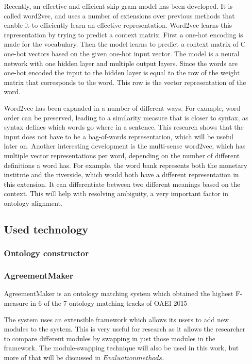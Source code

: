 \documentclass{article}
\begin{document}
 Recently, an effective and efficient skip-gram model has been developed. It is called word2vec, and uses a number of extensions over previous methods that enable it to efficiently learn an effective representation.
  Word2vec learns this representation by trying to predict a context matrix. First a one-hot encoding is made for the vocabulary. Then the model learns to predict a context matrix of C one-hot vectors based on the given one-hot input vector. The model is a neural network with one hidden layer and multiple output layers. Since the words are one-hot encoded the input to the hidden layer is equal to the row of the weight matrix that corresponds to the word. This row is the vector representation of the word.
 
 Word2vec has been expanded in a number of different ways. For example, word order can be preserved, leading to a similarity measure that is closer to syntax, as syntax defines which words go where in a sentence. This research shows that the input does not have to be a bag-of-words representation, which will be useful later on. %
 Another interesting development is the multi-sense word2vec, which has multiple vector representations per word, depending on the number of different definitions a word has. For example, the word bank represents both the monetary institute and the riverside, which would both have a different representation in this extension. It can differentiate between two different meanings based on the context. This will help with resolving ambiguity, a very important factor in ontology alignment.
 \subsection{Used technology}
 \subsubsection{Ontology constructor}
 \subsubsection{AgreementMaker}
 AgreementMaker is an ontology matching system which obtained the highest F-measure in 6 of the 7 ontology matching tracks of OAEI 2015 %
 
 The system uses an extensible framework which allows its users to add new modules to the system. This is very useful for research as it allows the researcher to compare different modules by swapping in just those modules in the framework. The module-swapping technique will also be used in this work, but more of that will be discussed in $Evaluation methods$.
 
\end{document}
